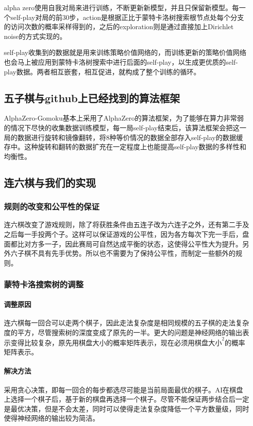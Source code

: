 \documentclass[c5size]{ctexart}
\begin{document}
	alpha zero使用自我对局来进行训练，不断更新新模型，并且只保留新模型。每一个self-play对局的前30步，action是根据正比于蒙特卡洛树搜索根节点处每个分支的访问次数的概率采样得到的，之后的exploration则是通过直接加上Dirichlet noise的方式实现的。\par
	
	self-play收集到的数据就是用来训练策略价值网络的，而训练更新的策略价值网络也会马上被应用到蒙特卡洛树搜索中进行后面的self-play，以生成更优质的self-play数据。两者相互嵌套，相互促进，就构成了整个训练的循环。\par
	
\subsection{五子棋与github上已经找到的算法框架}
	AlphaZero-Gomoku基本上采用了AlphaZero的算法框架，为了能够在算力非常弱的情况下尽快的收集数据训练模型，每一局self-play结束后，该算法框架会把这一局的数据进行旋转和镜像翻转，将8种等价情况的数据全部存入self-play的数据缓存中。这种旋转和翻转的数据扩充在一定程度上也能提高self-play数据的多样性和均衡性。
	
\subsection{连六棋与我们的实现}
	\subsubsection{规则的改变和公平性的保证}
		连六棋改变了游戏规则，除了将获胜条件由五连子改为六连子之外，还有第二手及之后每一手投两个子。这样可以保证游戏的公平性，因为各方每次下完一手后，盘面都比对方多一子，因此赛局可自然达成平衡的状态，这使得公平性大为提升。另外六子棋不具有先手优势。所以也不需要为了保持公平性，而制定一些额外的规则。
		
	\subsubsection{蒙特卡洛搜索树的调整}
		\paragraph{调整原因}
			连六棋每一回合可以走两个棋子，因此走法复杂度是相同规模的五子棋的走法复杂度的平方，尽管搜索树的深度变成了原先的一半。更大的问题是神经网络的输出表示变得比较复杂，原先用棋盘大小的概率矩阵表示，现在必须用$\text{棋盘大小}^2$的概率矩阵表示。
		\paragraph{解决方法}采用贪心决策，即每一回合的每步都选尽可能是当前局面最优的棋子。AI在棋盘上选择一个棋子后，基于新的棋盘再选择一个棋子。尽管不能保证两步结合后一定是最优决策，但是不会太差，同时可以使得走法复杂度降低一个平方数量级，同时使得神经网络的输出较为简洁。
\end{document}
